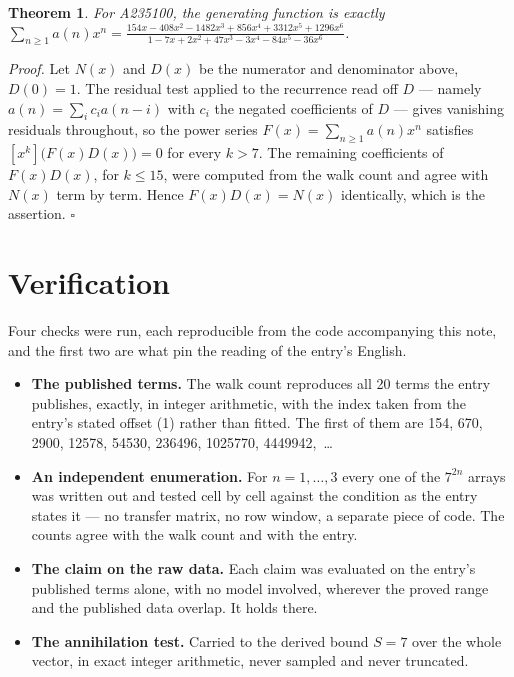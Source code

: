 \documentclass[11pt]{article}
\newtheorem{theorem}{Theorem}
\theoremstyle{definition}
\begin{document}
\begin{theorem} For A235100, the generating function is exactly $\sum_{n\ge 1} a(n)x^n = \frac{154x - 408x^{2} - 1482x^{3} + 856x^{4} + 3312x^{5} + 1296x^{6}}{1 - 7x + 2x^{2} + 47x^{3} - 3x^{4} - 84x^{5} - 36x^{6}}$.\end{theorem}

{\itshape Proof.} Let $N(x)$ and $D(x)$ be the numerator and denominator above, $D(0)=1$. The residual test applied to the recurrence read off $D$ --- namely $a(n) = \sum_i c_i a(n-i)$ with $c_i$ the negated coefficients of $D$ --- gives vanishing residuals throughout, so the power series $F(x)=\sum_{n\ge 1}a(n)x^n$ satisfies $[x^k]\bigl(F(x)D(x)\bigr) = 0$ for every $k > 7$. The remaining coefficients of $F(x)D(x)$, for $k \le 15$, were computed from the walk count and agree with $N(x)$ term by term. Hence $F(x)D(x) = N(x)$ identically, which is the assertion. $\square$

\section{Verification}

Four checks were run, each reproducible from the code accompanying this note, and the first two are what pin the reading of the entry's English.

\begin{itemize}

\item {\bfseries The published terms.} The walk count reproduces all 20 terms the entry publishes, exactly, in integer arithmetic, with the index taken from the entry's stated offset (1) rather than fitted. The first of them are 154, 670, 2900, 12578, 54530, 236496, 1025770, 4449942,~\dots

\item {\bfseries An independent enumeration.} For $n = 1,\dots,3$ every one of the $7^{2n}$ arrays was written out and tested cell by cell against the condition as the entry states it --- no transfer matrix, no row window, a separate piece of code. The counts agree with the walk count and with the entry.

\item {\bfseries The claim on the raw data.} Each claim was evaluated on the entry's published terms alone, with no model involved, wherever the proved range and the published data overlap. It holds there.

\item {\bfseries The annihilation test.} Carried to the derived bound $S = 7$ over the whole vector, in exact integer arithmetic, never sampled and never truncated.

\end{itemize}
\end{document}
